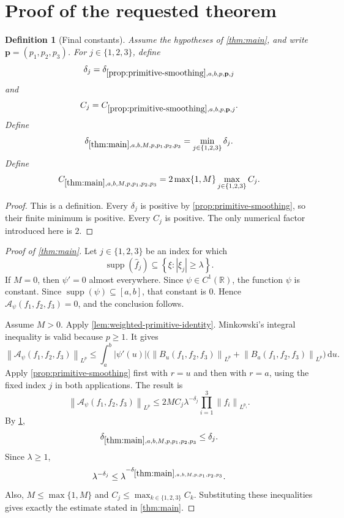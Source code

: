 \documentclass[11pt]{article}
\newtheorem{definition}[theorem]{Definition}
\newcommand{\R}{\mathbb{R}}
\newcommand{\supp}{\operatorname{supp}}
\newcommand{\A}{\mathcal{A}}
\newcommand{\dd}{\,\mathrm{d}}
\newcommand{\norm}[2]{\left\lVert #1\right\rVert_{#2}}
\newcommand{\Cst}[2]{C_{\ref{#1},#2}}
\newcommand{\Exp}[2]{\delta_{\ref{#1},#2}}
\newcommand{\abs}[1]{\left|#1\right|}
\newcommand{\set}[1]{\left\{#1\right\}}
\newcommand{\indices}{\{1,2,3\}}
\begin{document}
	\section{Proof of the requested theorem}\label{sec:main-proof}
	
	\begin{definition}[Final constants]\label{def:main-constants}
		Assume the hypotheses of \cref{thm:main}, and write \(\mathbf p=(p_1,p_2,p_3)\).  For \(j\in\indices\), define
		\[
		\delta_j=\Exp{prop:primitive-smoothing}{a,b,p,\mathbf p,j}
		\]
		and
		\[
		C_j=\Cst{prop:primitive-smoothing}{a,b,p,\mathbf p,j}.
		\]
		Define
		\[
		\Exp{thm:main}{a,b,M,p,p_1,p_2,p_3}
		=
		\min_{j\in\indices}\delta_j.
		\]
		Define
		\[
		\Cst{thm:main}{a,b,M,p,p_1,p_2,p_3}
		=
		2\max\{1,M\}\max_{j\in\indices}C_j.
		\]
	\end{definition}
	
	\begin{proof}
		This is a definition.  Every \(\delta_j\) is positive by \cref{prop:primitive-smoothing}, so their finite minimum is positive.  Every \(C_j\) is positive.  The only numerical factor introduced here is \(2\).
	\end{proof}
	
	\begin{proof}[Proof of \cref{thm:main}]
		Let \(j\in\indices\) be an index for which
		\[
		\supp(\widehat f_j)\subseteq\set{\xi:\abs{\xi_j}\geq\lambda}.
		\]
		If \(M=0\), then \(\psi'=0\) almost everywhere.  Since \(\psi\in C^1(\R)\), the function \(\psi\) is constant.  Since \(\supp(\psi)\subseteq[a,b]\), that constant is \(0\).  Hence \(\A_\psi(f_1,f_2,f_3)=0\), and the conclusion follows.
		
		Assume \(M>0\).  Apply \cref{lem:weighted-primitive-identity}.  Minkowski's integral inequality is valid because \(p\geq1\).  It gives
		\[
		\norm{\A_\psi(f_1,f_2,f_3)}{L^p}
		\leq
		\int_a^b\abs{\psi'(u)}
		\bigl(
		\norm{B_u(f_1,f_2,f_3)}{L^p}
		+
		\norm{B_a(f_1,f_2,f_3)}{L^p}
		\bigr)\dd u.
		\]
		Apply \cref{prop:primitive-smoothing} first with \(r=u\) and then with \(r=a\), using the fixed index \(j\) in both applications.  The result is
		\[
		\norm{\A_\psi(f_1,f_2,f_3)}{L^p}
		\leq
		2MC_j\lambda^{-\delta_j}
		\prod_{i=1}^{3}\norm{f_i}{L^{p_i}}.
		\]
		By \cref{def:main-constants},
		\[
		\Exp{thm:main}{a,b,M,p,p_1,p_2,p_3}\leq\delta_j.
		\]
		Since \(\lambda\geq1\),
		\[
		\lambda^{-\delta_j}
		\leq
		\lambda^{-\Exp{thm:main}{a,b,M,p,p_1,p_2,p_3}}.
		\]
		Also, \(M\leq\max\{1,M\}\) and \(C_j\leq\max_{k\in\indices}C_k\).  Substituting these inequalities gives exactly the estimate stated in \cref{thm:main}.
	\end{proof}
	
\end{document}
